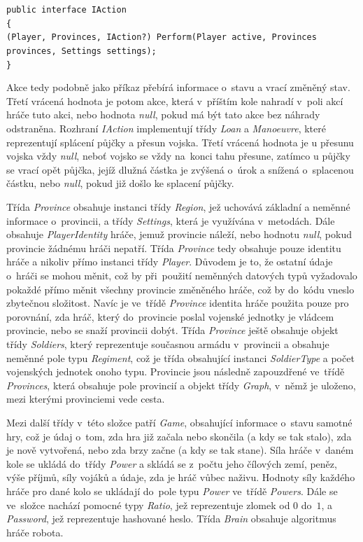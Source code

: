 \documentclass[a4paper,12pt]{article}
\def\keyword #1{\color{keyword}#1\color{black}}
\begin{document}
\scriptsize\selectfont
\texttt{\keyword{public interface }IAction}\\
\texttt{\{}\\
\hspace*{8mm}\texttt{(Player, Provinces, IAction?) Perform(Player active, Provinces provinces, Settings settings);}\\
\texttt{\}}\normalsize

Akce tedy podobně jako příkaz přebírá informace o~stavu a vrací změněný stav. Třetí vrácená hodnota je potom akce, která v~příštím kole nahradí v~poli akcí hráče tuto akci, nebo hodnota \textit{null}, pokud má být tato akce bez náhrady odstraněna. Rozhraní \textit{IAction} implementují třídy \textit{Loan} a \textit{Manoeuvre}, které reprezentují splácení půjčky a přesun vojska. Třetí vrácená hodnota je u přesunu vojska vždy \textit{null}, neboť vojsko se vždy na~konci tahu přesune, zatímco u půjčky se vrací opět půjčka, jejíž dlužná částka je zvýšená o~úrok a snížená o~splacenou částku, nebo \textit{null}, pokud již došlo ke splacení půjčky.

Třída \textit{Province} obsahuje instanci třídy \textit{Region}, jež uchovává základní a neměnné informace o~provincii, a třídy \textit{Settings}, která je využívána v~metodách. Dále obsahuje \textit{PlayerIdentity} hráče, jemuž provincie náleží, nebo hodnotu \textit{null}, pokud provincie žádnému hráči nepatří. Třída \textit{Province} tedy obsahuje pouze identitu hráče a nikoliv přímo instanci třídy \textit{Player}. Důvodem je to, že ostatní údaje o~hráči se mohou měnit, což by při~použití neměnných datových typů vyžadovalo pokaždé přímo měnit všechny provincie změněného hráče, což by do~kódu vneslo zbytečnou složitost. Navíc je ve~třídě \textit{Province} identita hráče použita pouze pro porovnání, zda hráč, který do~provincie poslal vojenské jednotky je vládcem provincie, nebo se snaží provincii dobýt. Třída \textit{Province} ještě obsahuje objekt třídy \textit{Soldiers}, který reprezentuje současnou armádu v~provincii a obsahuje neměnné pole typu \textit{Regiment}, což je třída obsahující instanci \textit{SoldierType} a počet vojenských jednotek onoho typu. Provincie jsou následně zapouzdřené ve~třídě \textit{Provinces}, která obsahuje pole provincií a objekt třídy \textit{Graph}, v~němž je uloženo, mezi kterými provinciemi vede cesta.

Mezi další třídy v~této složce patří \textit{Game}, obsahující informace o~stavu samotné hry, což je údaj o~tom, zda hra již začala nebo skončila (a kdy se tak stalo), zda je nově vytvořená, nebo zda brzy začne (a kdy se tak stane). Síla hráče v~daném kole se ukládá do~třídy \textit{Power} a skládá se z~počtu jeho čílových zemí, peněz, výše příjmů, síly vojáků a údaje, zda je hráč vůbec naživu. Hodnoty síly každého hráče pro dané kolo se ukládají do~pole typu \textit{Power} ve~třídě \textit{Powers}. Dále se ve~složce nachází pomocné typy \textit{Ratio}, jež reprezentuje zlomek od $0$ do~$1$, a \textit{Password}, jež reprezentuje hashované heslo. Třída \textit{Brain} obsahuje algoritmus hráče robota.
\end{document}
